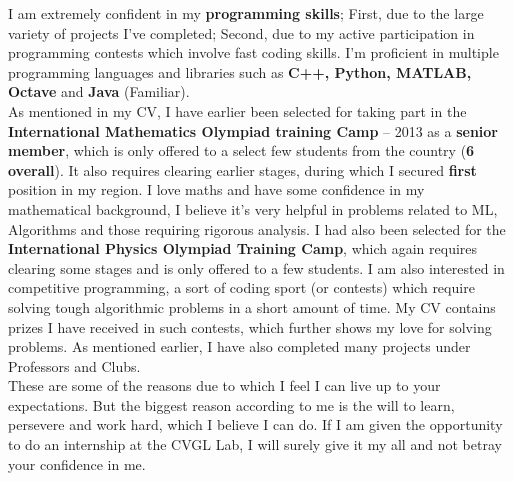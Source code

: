\documentclass[a4paper]{article}
\begin{document}
I am extremely confident in my \textbf{programming skills}; First, due to the large variety of projects I've completed; Second, due to my active participation in programming contests which involve fast coding skills. I'm proficient in multiple programming languages and libraries such as \textbf{C++, Python, MATLAB, Octave} and \textbf{Java} (Familiar).\\

As mentioned in my CV, I have earlier been selected for taking part in the \textbf{International Mathematics Olympiad training Camp} – 2013 as a \textbf{senior member}, which is only offered to a select few students from the country (\textbf{6 overall}). It also requires clearing earlier stages, during which I secured \textbf{first} position in my region. I love maths and have some confidence in my  mathematical background, I believe it's very helpful in problems related to ML, Algorithms and those requiring rigorous analysis. I had also been selected for the \textbf{International Physics Olympiad Training Camp}, which again requires clearing some stages and is only offered to a few students. I am also interested in competitive programming, a sort of coding sport (or contests) which require solving tough algorithmic problems in a short amount of time. My CV contains prizes I have received in such contests, which further shows my love for solving problems. As mentioned earlier, I have also completed many projects under Professors and Clubs. \\

These are some of the reasons due to which I feel I can live up to your expectations. But the biggest reason according to me is the will to learn, persevere and work hard, which I believe I can do. If I am given the opportunity to do an internship at the CVGL Lab, I will surely give it my all and not betray your confidence in me. \\
\end{document}
